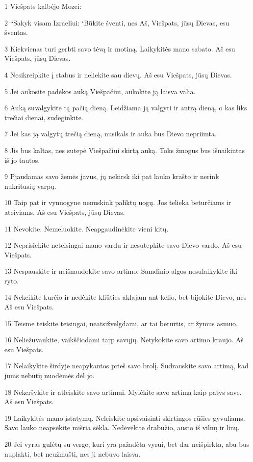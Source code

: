 \par 1 Viešpats kalbėjo Mozei: 
\par 2 “Sakyk visam Izraeliui: ‘Būkite šventi, nes Aš, Viešpats, jūsų Dievas, esu šventas. 
\par 3 Kiekvienas turi gerbti savo tėvą ir motiną. Laikykitės mano sabato. Aš esu Viešpats, jūsų Dievas. 
\par 4 Nesikreipkite į stabus ir neliekite sau dievų. Aš esu Viešpats, jūsų Dievas. 
\par 5 Jei aukosite padėkos auką Viešpačiui, aukokite ją laisva valia. 
\par 6 Auką suvalgykite tą pačią dieną. Leidžiama ją valgyti ir antrą dieną, o kas liks trečiai dienai, sudeginkite. 
\par 7 Jei kas ją valgytų trečią dieną, nusikals ir auka bus Dievo nepriimta. 
\par 8 Jis bus kaltas, nes sutepė Viešpačiui skirtą auką. Toks žmogus bus išnaikintas iš jo tautos. 
\par 9 Pjaudamas savo žemės javus, jų nekirsk iki pat lauko krašto ir nerink nukritusių varpų. 
\par 10 Taip pat ir vynuogyne nenuskink paliktų uogų. Jos telieka beturčiams ir ateiviams. Aš esu Viešpats, jūsų Dievas. 
\par 11 Nevokite. Nemeluokite. Neapgaudinėkite vieni kitų. 
\par 12 Neprisiekite neteisingai mano vardu ir nesutepkite savo Dievo vardo. Aš esu Viešpats. 
\par 13 Nespauskite ir neišnaudokite savo artimo. Samdinio algos nesulaikykite iki ryto. 
\par 14 Nekeikite kurčio ir nedėkite kliūties aklajam ant kelio, bet bijokite Dievo, nes Aš esu Viešpats. 
\par 15 Teisme teiskite teisingai, neatsižvelgdami, ar tai beturtis, ar žymus asmuo. 
\par 16 Neliežuvaukite, vaikščiodami tarp savųjų. Netykokite savo artimo kraujo. Aš esu Viešpats. 
\par 17 Nelaikykite širdyje neapykantos prieš savo brolį. Sudrauskite savo artimą, kad jums nebūtų nuodėmės dėl jo. 
\par 18 Nekeršykite ir atleiskite savo artimui. Mylėkite savo artimą kaip patys save. Aš esu Viešpats. 
\par 19 Laikykitės mano įstatymų. Neleiskite apsivaisinti skirtingos rūšies gyvuliams. Savo lauko neapsėkite mišria sėkla. Nedėvėkite drabužio, austo iš vilnų ir linų. 
\par 20 Jei vyras gulėtų su verge, kuri yra pažadėta vyrui, bet dar neišpirkta, abu bus nuplakti, bet neužmušti, nes ji nebuvo laisva. 
